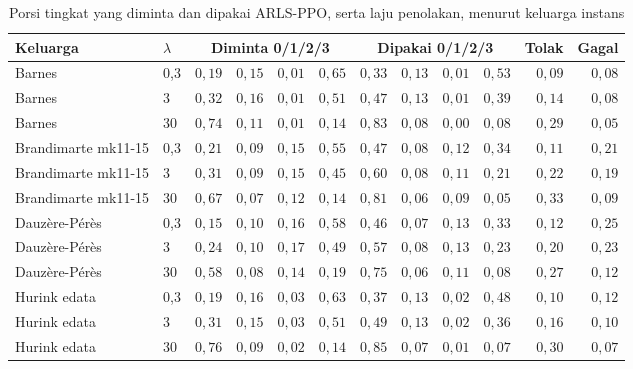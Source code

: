 \begin{table}[htbp]
\caption{Porsi tingkat yang diminta dan dipakai ARLS-PPO, serta laju penolakan, menurut keluarga instans}
\label{tab:uji-tingkat}
\centering\footnotesize
\setlength{\tabcolsep}{4pt}
\begin{adjustbox}{max width=\textwidth}
\begin{tabular}{llrrrrrrrrrr}
\toprule
Keluarga & $\lambda$ & \multicolumn{4}{c}{Diminta 0/1/2/3} & \multicolumn{4}{c}{Dipakai 0/1/2/3} & Tolak & Gagal \\
\midrule
Barnes & 0{,}3 & $0{,}19$ & $0{,}15$ & $0{,}01$ & $0{,}65$ & $0{,}33$ & $0{,}13$ & $0{,}01$ & $0{,}53$ & $0{,}09$ & $0{,}08$ \\
Barnes & 3 & $0{,}32$ & $0{,}16$ & $0{,}01$ & $0{,}51$ & $0{,}47$ & $0{,}13$ & $0{,}01$ & $0{,}39$ & $0{,}14$ & $0{,}08$ \\
Barnes & 30 & $0{,}74$ & $0{,}11$ & $0{,}01$ & $0{,}14$ & $0{,}83$ & $0{,}08$ & $0{,}00$ & $0{,}08$ & $0{,}29$ & $0{,}05$ \\
\addlinespace
Brandimarte mk11-15 & 0{,}3 & $0{,}21$ & $0{,}09$ & $0{,}15$ & $0{,}55$ & $0{,}47$ & $0{,}08$ & $0{,}12$ & $0{,}34$ & $0{,}11$ & $0{,}21$ \\
Brandimarte mk11-15 & 3 & $0{,}31$ & $0{,}09$ & $0{,}15$ & $0{,}45$ & $0{,}60$ & $0{,}08$ & $0{,}11$ & $0{,}21$ & $0{,}22$ & $0{,}19$ \\
Brandimarte mk11-15 & 30 & $0{,}67$ & $0{,}07$ & $0{,}12$ & $0{,}14$ & $0{,}81$ & $0{,}06$ & $0{,}09$ & $0{,}05$ & $0{,}33$ & $0{,}09$ \\
\addlinespace
Dauzère-Pérès & 0{,}3 & $0{,}15$ & $0{,}10$ & $0{,}16$ & $0{,}58$ & $0{,}46$ & $0{,}07$ & $0{,}13$ & $0{,}33$ & $0{,}12$ & $0{,}25$ \\
Dauzère-Pérès & 3 & $0{,}24$ & $0{,}10$ & $0{,}17$ & $0{,}49$ & $0{,}57$ & $0{,}08$ & $0{,}13$ & $0{,}23$ & $0{,}20$ & $0{,}23$ \\
Dauzère-Pérès & 30 & $0{,}58$ & $0{,}08$ & $0{,}14$ & $0{,}19$ & $0{,}75$ & $0{,}06$ & $0{,}11$ & $0{,}08$ & $0{,}27$ & $0{,}12$ \\
\addlinespace
Hurink edata & 0{,}3 & $0{,}19$ & $0{,}16$ & $0{,}03$ & $0{,}63$ & $0{,}37$ & $0{,}13$ & $0{,}02$ & $0{,}48$ & $0{,}10$ & $0{,}12$ \\
Hurink edata & 3 & $0{,}31$ & $0{,}15$ & $0{,}03$ & $0{,}51$ & $0{,}49$ & $0{,}13$ & $0{,}02$ & $0{,}36$ & $0{,}16$ & $0{,}10$ \\
Hurink edata & 30 & $0{,}76$ & $0{,}09$ & $0{,}02$ & $0{,}14$ & $0{,}85$ & $0{,}07$ & $0{,}01$ & $0{,}07$ & $0{,}30$ & $0{,}07$ \\

\end{tabular}
\end{adjustbox}
\end{table}
